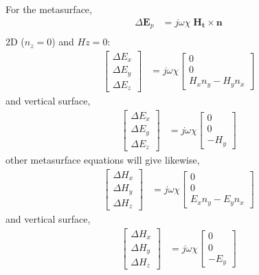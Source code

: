 \documentclass{article}
\newcommand{\E}{\mathbf{E}}
\newcommand{\n}{\mathbf{n}}
\newcommand{\Ht}{\mathbf{H_t}}
\newcommand{\dE}{\Delta E}
\newcommand{\dH}{\Delta H}
\newcommand{\0}{\varnothing}
\begin{document}
\newpage
For the metasurface,
\begin{align*}
    \Delta \E_p &= j \omega \chi\; \Ht \times \n\\
\end{align*}
2D ($n_z = 0$) and $Hz = 0$:
\begin{align*}
	\left[
    \begin{array}{c}
     \dE_x\\
     \dE_y\\
	 \dE_z 
	 \end{array} \right]
  &= j \omega \chi \left[
    \begin{array}{c}
     0\\
     0\\
    H_x n_y - H_y n_x
    \end{array} \right]
\end{align*}
and vertical surface,
\begin{align*}
	\left[
    \begin{array}{c}
     \dE_x\\
     \dE_y\\
	 \dE_z
	 \end{array} \right]
  &= j \omega \chi \left[
    \begin{array}{c}
     0\\
     0\\
    - H_y
    \end{array} \right]
\end{align*}
other metasurface equations will give likewise,
\begin{align*}
	\left[
    \begin{array}{c}
     \dH_x\\
     \dH_y\\
	 \dH_z
	 \end{array} \right]
  &= j \omega \chi \left[
    \begin{array}{c}
     0\\
     0\\
    E_x n_y - E_y n_x
    \end{array} \right]
\end{align*}
and vertical surface,
\begin{align*}
	\left[
    \begin{array}{c}
     \dH_x\\
     \dH_y\\
	 \dH_z
	 \end{array} \right]
  &= j \omega \chi \left[
    \begin{array}{c}
     0\\
     0\\
    - E_y
    \end{array} \right]
\end{align*}
\end{document}
